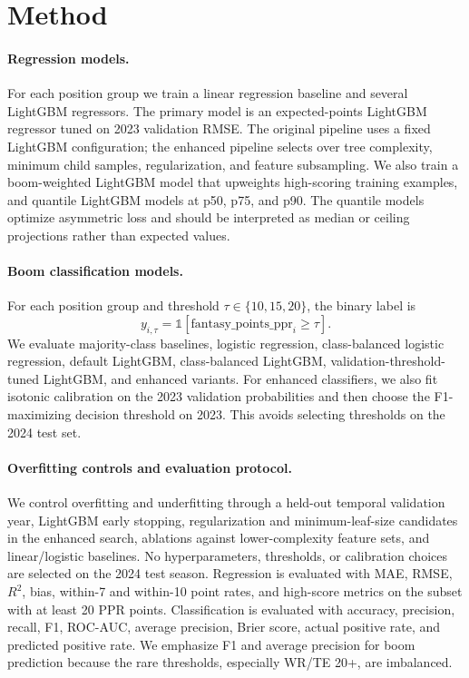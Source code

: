 \documentclass{article}
\begin{document}
\section{Method}
\paragraph{Regression models.}
For each position group we train a linear regression baseline and several LightGBM regressors. The primary model is an expected-points LightGBM regressor tuned on 2023 validation RMSE. The original pipeline uses a fixed LightGBM configuration; the enhanced pipeline selects over tree complexity, minimum child samples, regularization, and feature subsampling. We also train a boom-weighted LightGBM model that upweights high-scoring training examples, and quantile LightGBM models at p50, p75, and p90. The quantile models optimize asymmetric loss and should be interpreted as median or ceiling projections rather than expected values.

\paragraph{Boom classification models.}
For each position group and threshold $\tau \in \{10,15,20\}$, the binary label is
\[
  y_{i,\tau} = \mathbb{1}[\mathrm{fantasy\_points\_ppr}_i \geq \tau].
\]
We evaluate majority-class baselines, logistic regression, class-balanced logistic regression, default LightGBM, class-balanced LightGBM, validation-threshold-tuned LightGBM, and enhanced variants. For enhanced classifiers, we also fit isotonic calibration on the 2023 validation probabilities and then choose the F1-maximizing decision threshold on 2023. This avoids selecting thresholds on the 2024 test set.

\paragraph{Overfitting controls and evaluation protocol.}
We control overfitting and underfitting through a held-out temporal validation year, LightGBM early stopping, regularization and minimum-leaf-size candidates in the enhanced search, ablations against lower-complexity feature sets, and linear/logistic baselines. No hyperparameters, thresholds, or calibration choices are selected on the 2024 test season. Regression is evaluated with MAE, RMSE, $R^2$, bias, within-7 and within-10 point rates, and high-score metrics on the subset with at least 20 PPR points. Classification is evaluated with accuracy, precision, recall, F1, ROC-AUC, average precision, Brier score, actual positive rate, and predicted positive rate. We emphasize F1 and average precision for boom prediction because the rare thresholds, especially WR/TE 20+, are imbalanced.
\end{document}
